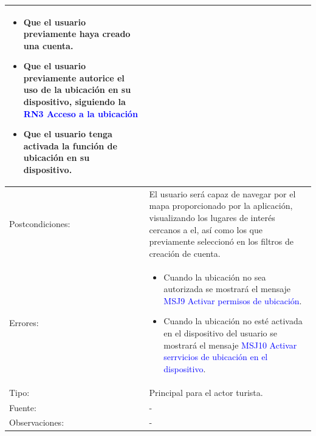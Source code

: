 \begin{tabularx}{16cm}{||l|X||}
{\begin{itemize}
            \item Que el usuario previamente haya creado una cuenta.
            \item Que el usuario previamente autorice el uso de la ubicación en su dispositivo, siguiendo la {\textcolor{blue}{RN3 Acceso a la ubicación}} 
            \item  Que el usuario tenga activada la función de ubicación en su dispositivo.
        \end{itemize}}\\ 
	\hline
	{Postcondiciones:} & {El usuario será capaz de navegar por el mapa proporcionado por la aplicación, visualizando los lugares de interés cercanos a el, así como los que previamente seleccionó en los filtros de creación de cuenta.}\\
	\hline
	{Errores:} & \begin{itemize}
            \item Cuando la ubicación no sea autorizada se mostrará el mensaje {\textcolor{blue}{MSJ9 Activar permisos de ubicación}}.
            \item Cuando la ubicación no esté activada en el dispositivo del usuario se mostrará el mensaje {\textcolor{blue}{MSJ10 Activar serrvicios de ubicación en el dispositivo}}.
        \end{itemize} \\
	\hline
	{Tipo:} & {Principal para el actor turista.}\\
	\hline
	{Fuente:} & {-} \\
	\hline
	{Observaciones:} & {-} \\
	\hline
\end{tabularx}

\pagebreak
